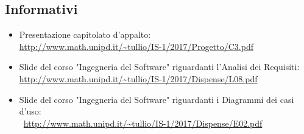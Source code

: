 \documentclass[./AnalisideiRequisiti.tex]{subfiles}
\begin{document}
\subsection{Informativi}
\begin{itemize}
	\item Presentazione capitolato d'appalto: \\ \url{http://www.math.unipd.it/~tullio/IS-1/2017/Progetto/C3.pdf}
	\item Slide del corso "Ingegneria del Software" riguardanti l'Analisi dei Requisiti: \\ \url{http://www.math.unipd.it/~tullio/IS-1/2017/Dispense/L08.pdf}
	\item Slide del corso "Ingegneria del Software" riguardanti i Diagrammi dei casi d'uso: \\\ \url{http://www.math.unipd.it/~tullio/IS-1/2017/Dispense/E02.pdf}
\end{itemize}
\end{document}
